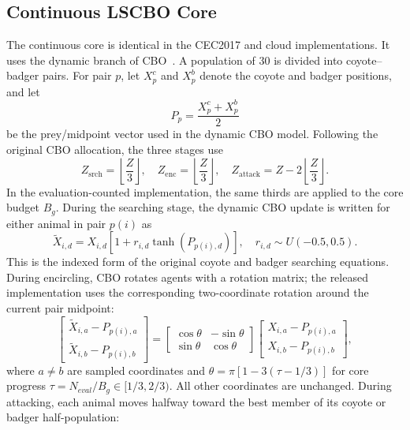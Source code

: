 \documentclass[pdflatex,onecolumn,sn-mathphys-num]{sn-jnl}
\begin{document}
\subsection{Continuous LSCBO Core}
The continuous core is identical in the CEC2017 and cloud implementations. It uses the dynamic branch of CBO~\cite{Khatab2025}. A population of 30 is divided into coyote--badger pairs. For pair $p$, let $X_p^c$ and $X_p^b$ denote the coyote and badger positions, and let
\begin{equation}
P_p=\frac{X_p^c+X_p^b}{2}
\end{equation}
be the prey/midpoint vector used in the dynamic CBO model. Following the original CBO allocation, the three stages use
\begin{equation}
Z_{\mathrm{srch}}=\left\lfloor\frac{Z}{3}\right\rfloor,\quad
Z_{\mathrm{enc}}=\left\lfloor\frac{Z}{3}\right\rfloor,\quad
Z_{\mathrm{attack}}=Z-2\left\lfloor\frac{Z}{3}\right\rfloor .
\end{equation}
In the evaluation-counted implementation, the same thirds are applied to the core budget $B_g$. During the searching stage, the dynamic CBO update is written for either animal in pair $p(i)$ as
\begin{equation}
\widetilde{X}_{i,d}=X_{i,d}\left[1+r_{i,d}\tanh(P_{p(i),d})\right],
\quad r_{i,d}\sim U(-0.5,0.5).
\end{equation}
This is the indexed form of the original coyote and badger searching equations. During encircling, CBO rotates agents with a rotation matrix; the released implementation uses the corresponding two-coordinate rotation around the current pair midpoint:
\begin{equation}
\begin{bmatrix}
\widetilde{X}_{i,a}-P_{p(i),a}\\
\widetilde{X}_{i,b}-P_{p(i),b}
\end{bmatrix}
=
\begin{bmatrix}
\cos\theta & -\sin\theta\\
\sin\theta & \cos\theta
\end{bmatrix}
\begin{bmatrix}
X_{i,a}-P_{p(i),a}\\
X_{i,b}-P_{p(i),b}
\end{bmatrix},
\end{equation}
where $a\ne b$ are sampled coordinates and $\theta=\pi[1-3(\tau-1/3)]$ for core progress $\tau=N_{eval}/B_g\in[1/3,2/3)$. All other coordinates are unchanged. During attacking, each animal moves halfway toward the best member of its coyote or badger half-population:
\end{document}

